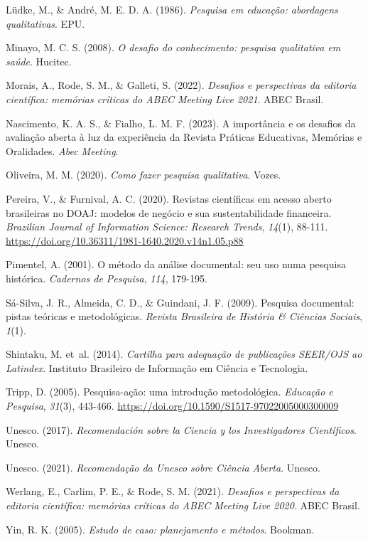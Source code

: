 \documentclass[
  a4paper,
]{book}
\newlength{\cslhangindent}
\newenvironment{CSLReferences}[2] %
 {\begin{list}{}{%
  \setlength{\itemindent}{0pt}
  \setlength{\leftmargin}{0pt}
  \setlength{\parsep}{0pt}
  \ifodd #1
   \setlength{\leftmargin}{\cslhangindent}
   \setlength{\itemindent}{-1\cslhangindent}
  \fi
  \setlength{\itemsep}{#2\baselineskip}}}
 {\end{list}}
\begin{document}
\begin{CSLReferences}{1}{0}
Lüdke, M., \& André, M. E. D. A. (1986). \emph{Pesquisa em educação:
abordagens qualitativas}. EPU.

Minayo, M. C. S. (2008). \emph{O desafio do conhecimento: pesquisa
qualitativa em saúde}. Hucitec.

Morais, A., Rode, S. M., \& Galleti, S. (2022). \emph{Desafios e
perspectivas da editoria científica: memórias críticas do ABEC Meeting
Live 2021}. ABEC Brasil.

Nascimento, K. A. S., \& Fialho, L. M. F. (2023). A importância e os
desafios da avaliação aberta à luz da experiência da Revista Práticas
Educativas, Memórias e Oralidades. \emph{Abec Meeting}.

Oliveira, M. M. (2020). \emph{Como fazer pesquisa qualitativa}. Vozes.

Pereira, V., \& Furnival, A. C. (2020). Revistas científicas em acesso
aberto brasileiras no DOAJ: modelos de negócio e sua sustentabilidade
financeira. \emph{Brazilian Journal of Information Science: Research
Trends}, \emph{14}(1), 88-111.
\url{https://doi.org/10.36311/1981-1640.2020.v14n1.05.p88}

Pimentel, A. (2001). O método da análise documental: seu uso numa
pesquisa histórica. \emph{Cadernos de Pesquisa}, \emph{114}, 179-195.

Sá-Silva, J. R., Almeida, C. D., \& Guindani, J. F. (2009). Pesquisa
documental: pistas teóricas e metodológicas. \emph{Revista Brasileira de
História \& Ciências Sociais}, \emph{1}(1).

Shintaku, M. et~al. (2014). \emph{Cartilha para adequação de publicações
SEER/OJS ao Latindex}. Instituto Brasileiro de Informação em Ciência e
Tecnologia.

Tripp, D. (2005). Pesquisa-ação: uma introdução metodológica.
\emph{Educação e Pesquisa}, \emph{31}(3), 443-466.
\url{https://doi.org/10.1590/S1517-97022005000300009}

Unesco. (2017). \emph{Recomendación sobre la Ciencia y los
Investigadores Científicos}. Unesco.

Unesco. (2021). \emph{Recomendação da Unesco sobre Ciência Aberta}.
Unesco.

Werlang, E., Carlim, P. E., \& Rode, S. M. (2021). \emph{Desafios e
perspectivas da editoria científica: memórias críticas do ABEC Meeting
Live 2020}. ABEC Brasil.

Yin, R. K. (2005). \emph{Estudo de caso: planejamento e métodos}.
Bookman.

\end{CSLReferences}


\backmatter
\end{document}
